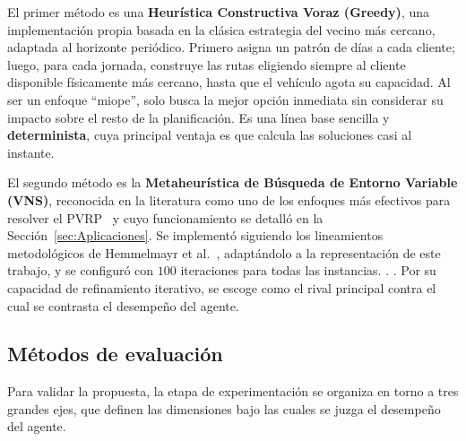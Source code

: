El primer método es una \textbf{Heurística Constructiva Voraz (Greedy)}, una implementación propia basada en la clásica estrategia del vecino más cercano, adaptada al horizonte periódico. Primero asigna un patrón de días a cada cliente; luego, para cada jornada, construye las rutas eligiendo siempre al cliente disponible físicamente más cercano, hasta que el vehículo agota su capacidad. Al ser un enfoque \enquote{miope}, solo busca la mejor opción inmediata sin considerar su impacto sobre el resto de la planificación. Es una línea base sencilla y \textbf{determinista}, cuya principal ventaja es que calcula las soluciones casi al instante.

El segundo método es la \textbf{Metaheurística de Búsqueda de Entorno Variable (VNS)}, reconocida en la literatura como uno de los enfoques más efectivos para resolver el PVRP~\cite{HEMMELMAYR2009791} y cuyo funcionamiento se detalló en la Sección~\ref{sec:Aplicaciones}. Se implementó siguiendo los lineamientos metodológicos de Hemmelmayr et al.~\cite{HEMMELMAYR2009791}, adaptándolo a la representación de este trabajo, y se configuró con $100$ iteraciones para todas las instancias. . . Por su capacidad de refinamiento iterativo, se escoge como el rival principal contra el cual se contrasta el desempeño del agente.



\subsection{Métodos de evaluación} \label{sec:Metodosdeevaluacion}
Para validar la propuesta, la etapa de experimentación se organiza en torno a tres grandes ejes, que definen las dimensiones bajo las cuales se juzga el desempeño del agente.

